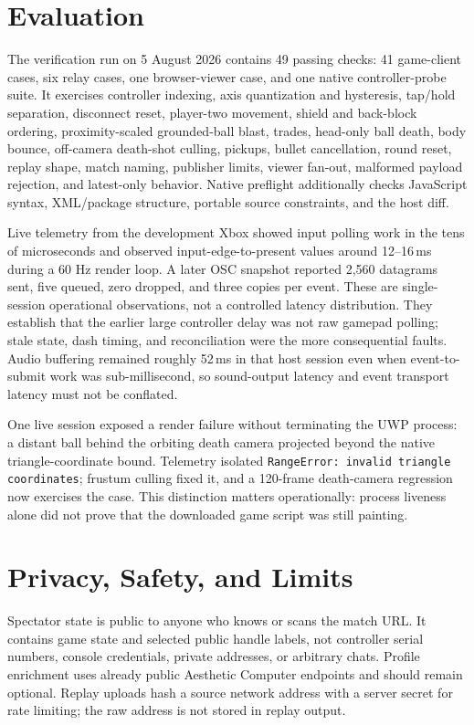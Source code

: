\documentclass[10pt,letterpaper,twocolumn]{article}
\newcommand{\code}[1]{\texttt{#1}}
\begin{document}
\section{Evaluation}

The verification run on 5 August 2026 contains 49 passing checks: 41 game-client cases, six relay cases, one browser-viewer case, and one native controller-probe suite. It exercises controller indexing, axis quantization and hysteresis, tap/hold separation, disconnect reset, player-two movement, shield and back-block ordering, proximity-scaled grounded-ball blast, trades, head-only ball death, body bounce, off-camera death-shot culling, pickups, bullet cancellation, round reset, replay shape, match naming, publisher limits, viewer fan-out, malformed payload rejection, and latest-only behavior. Native preflight additionally checks JavaScript syntax, XML/package structure, portable source constraints, and the host diff.

Live telemetry from the development Xbox showed input polling work in the tens of microseconds and observed input-edge-to-present values around 12--16\,ms during a 60 Hz render loop. A later OSC snapshot reported 2,560 datagrams sent, five queued, zero dropped, and three copies per event. These are single-session operational observations, not a controlled latency distribution. They establish that the earlier large controller delay was not raw gamepad polling; stale state, dash timing, and reconciliation were the more consequential faults. Audio buffering remained roughly 52\,ms in that host session even when event-to-submit work was sub-millisecond, so sound-output latency and event transport latency must not be conflated.

One live session exposed a render failure without terminating the UWP process: a distant ball behind the orbiting death camera projected beyond the native triangle-coordinate bound. Telemetry isolated \code{RangeError: invalid triangle coordinates}; frustum culling fixed it, and a 120-frame death-camera regression now exercises the case. This distinction matters operationally: process liveness alone did not prove that the downloaded game script was still painting.

\section{Privacy, Safety, and Limits}

Spectator state is public to anyone who knows or scans the match URL. It contains game state and selected public handle labels, not controller serial numbers, console credentials, private addresses, or arbitrary chats. Profile enrichment uses already public Aesthetic Computer endpoints and should remain optional. Replay uploads hash a source network address with a server secret for rate limiting; the raw address is not stored in replay output.
\end{document}
